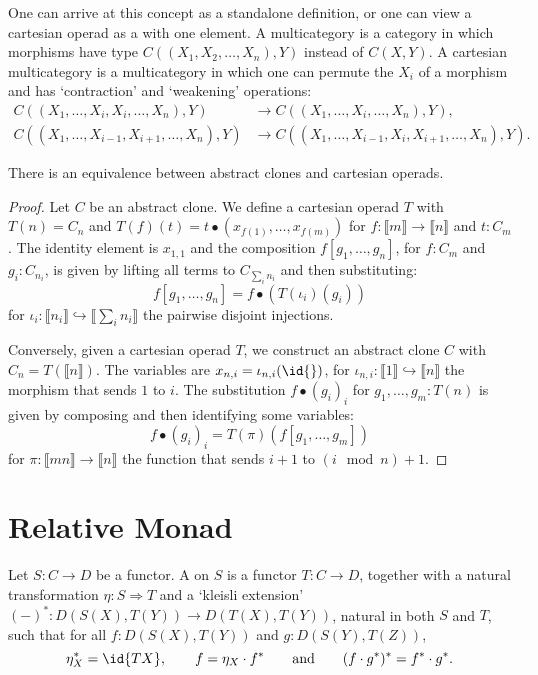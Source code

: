 \begin{remark}
  One can arrive at this concept as a standalone definition, or one can view a cartesian operad as a  with one element. A multicategory is a category in which morphisms have type $ C((X_1, X_2, \dots, X_n), Y) $ instead of $ C(X, Y) $. A cartesian multicategory is a multicategory in which one can permute the $ X_i $ of a morphism and has `contraction' and `weakening' operations:
  \begin{align*}
    C((X_1, \dots, X_i, X_i, \dots, X_n), Y) &\to C((X_1, \dots, X_i, \dots, X_n), Y),\\
    C((X_1, \dots, X_{i - 1}, X_{i + 1}, \dots, X_n), Y) &\to C((X_1, \dots, X_{i - 1}, X_i, X_{i + 1}, \dots, X_n), Y).
  \end{align*}
\end{remark}

\begin{lemma}
  There is an equivalence between abstract clones and cartesian operads.
\end{lemma}
\begin{proof}
  Let $ C $ be an abstract clone. We define a cartesian operad $ T $ with $ T(n) = C_n $ and $ T(f)(t) = t \bullet (x_{f(1)}, \dots, x_{f(m)}) $ for $ f: \llbracket m \rrbracket \to \llbracket n \rrbracket $ and $ t: C_m $. The identity element is $ x_{1, 1} $ and the composition $ f[g_1, \dots, g_n] $, for $ f: C_m $ and $ g_i: C_{n_i} $, is given by lifting all terms to $ C_{\sum_i n_i} $ and then substituting:
  \[ f[g_1, \dots, g_n] = f \bullet (T(\iota_i)(g_i)) \]
  for $ \iota_i : \llbracket n_i \rrbracket \hookrightarrow \llbracket \sum_i n_i \rrbracket $ the pairwise disjoint injections.

  Conversely, given a cartesian operad $ T $, we construct an abstract clone $ C $ with $ C_n = T(\llbracket n \rrbracket) $. The variables are $ x_{n, i} = \iota_{n, i}(\id{}) $, for $ \iota_{n, i}: \llbracket 1 \rrbracket \hookrightarrow \llbracket n \rrbracket $ the morphism that sends $ 1 $ to $ i $. The substitution $ f \bullet (g_i)_i $ for $ g_1, \dots, g_m: T(n) $ is given by composing and then identifying some variables:
  \[ f \bullet (g_i)_i = T(\pi)(f[g_1, \dots, g_m]) \]
  for $ \pi: \llbracket m n \rrbracket \to \llbracket n \rrbracket $ the function that sends $ i + 1 $ to $ (i \mod n) + 1 $.
\end{proof}

\section{Relative Monad}
\begin{definition}
  Let $ S: C \to D $ be a functor. A  on $ S $ is a functor $ T: C \to D $, together with a natural transformation $ \eta: S \Rightarrow T $ and a `kleisli extension' $ (-)^*: D(S(X), T(Y)) \to D(T(X), T(Y)) $, natural in both $ S $ and $ T $, such that for all $ f: D(S(X), T(Y)) $ and $ g: D(S(Y), T(Z)) $,
  \[ \eta_X^* = \id{T X}, \qquad f = \eta_X \cdot f^* \qquad \text{and} \qquad (f \cdot g^*)^* = f^* \cdot g^*. \]
\end{definition}

